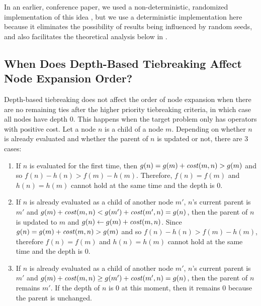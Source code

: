 In an earlier, conference paper, we used a non-deterministic,
randomized implementation of this idea \cite{Asai2016}, but we use a deterministic
implementation here because it eliminates the possibility of results being influenced by random seeds,
and also facilitates the  theoretical analysis below in .


\subsection{When Does Depth-Based Tiebreaking Affect Node Expansion Order?}

Depth-based tiebreaking does not affect the order of node expansion when there are no remaining ties after the
higher priority tiebreaking criteria, in which case all nodes have depth 0. 
% 
This happens when the target problem only has operators with positive cost.
Let a node $n$ is a child of a node $m$. Depending on whether $n$ is already evaluated and whether the parent of $n$ is updated or not, there are 3 cases:

\begin{enumerate}
 \item If $n$ is evaluated for the first time,
       then $g(n)=g(m)+\mit{cost}(m,n) > g(m)$ and so $f(n)-h(n) > f(m)-h(m)$.
       Therefore, $f(n)=f(m)$ and $h(n)=h(m)$ cannot hold at the same time and the depth is 0.
 \item If $n$ is already evaluated as a child of another node $m'$, $n$'s current parent is $m'$ and
       $g(m)+\mit{cost}(m,n) < g(m') + \mit{cost}(m',n) = g(n)$,
       then the parent of $n$ is updated to $m$ and $g(n)\leftarrow g(m)+\mit{cost}(m,n)$.
       Since $g(n)=g(m)+\mit{cost}(m,n)>g(m)$ and so $f(n)-h(n) > f(m)-h(m)$,
       therefore $f(n)=f(m)$ and $h(n)=h(m)$ cannot hold at the same time and the depth is 0.
 \item If $n$ is already evaluated as a child of another node $m'$, $n$'s current parent is $m'$ and
       $g(m)+\mit{cost}(m,n) \geq g(m') + \mit{cost}(m',n) = g(n)$, then the parent of $n$ remains $m'$. If the
       depth of $n$ is 0 at this moment, then it remains 0 because the parent is unchanged.
\end{enumerate}

